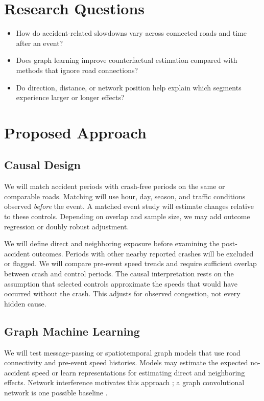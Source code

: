 \documentclass[sigconf,nonacm]{acmart}
\begin{document}
\section{Research Questions}
\begin{itemize}
    \item How do accident-related slowdowns vary across connected
    roads and time after an event?
    \item Does graph learning improve counterfactual estimation
    compared with methods that ignore road connections?
    \item Do direction, distance, or network position help explain
    which segments experience larger or longer effects?
\end{itemize}

\section{Proposed Approach}
\subsection{Causal Design}
We will match accident periods with crash-free periods on the same or
comparable roads. Matching will use hour, day, season, and traffic
conditions observed \emph{before} the event. A matched event study
will estimate changes relative to these controls. Depending on overlap
and sample size, we may add outcome regression or doubly robust
adjustment.

We will define direct and neighboring exposure before examining the
post-accident outcomes. Periods with other nearby reported crashes
will be excluded or flagged. We will compare pre-event speed trends
and require sufficient overlap between crash and control periods.
The causal interpretation rests on the assumption that selected
controls approximate the speeds that would have occurred without the
crash. This adjusts for observed congestion, not every hidden cause.

\subsection{Graph Machine Learning}
We will test message-passing or spatiotemporal graph models that use
road connectivity and pre-event speed histories. Models may estimate
the expected no-accident speed or learn representations for estimating
direct and neighboring effects. Network interference motivates this
approach \cite{ma2021interference}; a graph convolutional network is
one possible baseline \cite{kipf2017gcn}.
\end{document}
